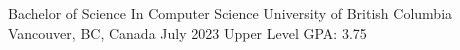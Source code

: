 \begin{cventries}
  \cventry
    {Bachelor of Science In Computer Science} %
    {University of British Columbia} %
    {Vancouver, BC, Canada} %
    {July 2023} %
    {Upper Level GPA: 3.75}
\end{cventries}
